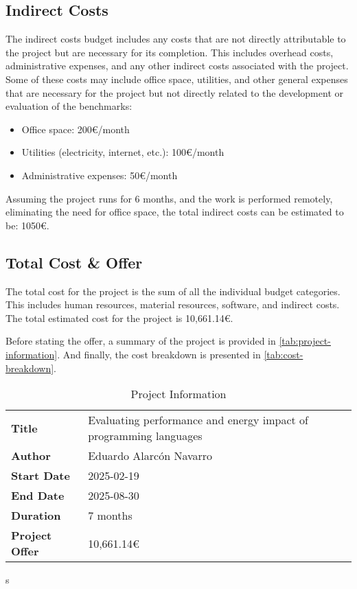 \subsection{Indirect Costs}
The indirect costs budget includes any costs that are not directly attributable to the project but are necessary for its completion. This includes overhead costs, administrative expenses, and any other indirect costs associated with the project. 
Some of these costs may include office space, utilities, and other general expenses that are necessary for the project but not directly related to the development or evaluation of the benchmarks:
\begin{itemize}
    \item Office space: 200€/month
    \item Utilities (electricity, internet, etc.): 100€/month
    \item Administrative expenses: 50€/month
\end{itemize}
Assuming the project runs for 6 months, and the work is performed remotely, eliminating the need for office space, the total indirect costs can be estimated to be: 1050€.

\subsection{Total Cost \& Offer}
The total cost for the project is the sum of all the individual budget categories. This includes human resources, material resources, software, and indirect costs. The total estimated cost for the project is 10,661.14€.

Before stating the offer, a summary of the project is provided in \autoref{tab:project-information}. And finally, the cost breakdown is presented in \autoref{tab:cost-breakdown}.

\begin{table}[h]
  \centering
  \begin{adjustbox}{max width=\textwidth}

  \begin{tabular}{|l|l|}
    \hline
    \textbf{Title}         & Evaluating performance and energy impact of programming languages \\ 
    \textbf{Author}        & Eduardo Alarcón Navarro \\ 
    \textbf{Start Date}    & 2025-02-19 \\ 
    \textbf{End Date}      & 2025-08-30 \\ 
    \textbf{Duration}      & 7 months \\ 
    \hline
    \textbf{Project Offer} & 10,661.14€      \\ 
    \hline
  \end{tabular}
  \end{adjustbox}

  \caption{Project Information}
  \label{tab:project-information}
\end{table}s


